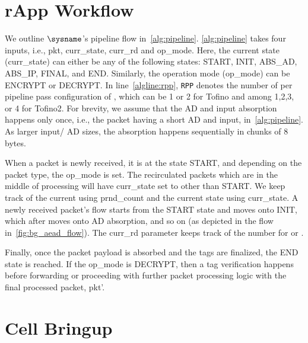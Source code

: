 \clearpage
\appendix
\newpage

\section{rApp Workflow}
\label{appendix:main_algo}

We outline $\sysname$'s pipeline flow in~\cref{alg:pipeline}. 
\cref{alg:pipeline} takes four inputs, i.e., \textsf{pkt}, \textsf{curr\_state}, \textsf{curr\_rd} and \textsf{op\_mode}.
Here, the current state (\textsf{curr\_state}) can either be any of the following states: START, INIT, ABS\_AD, ABS\_IP, FINAL, and END.
Similarly, the operation mode (\textsf{op\_mode}) can be ENCRYPT or DECRYPT.
In line~\ref{algline:rpp}, \texttt{RPP} denotes the number of \pround per pipeline pass configuration of \sysname, which can be 1 or 2 for Tofino and among 1,2,3, or 4 for Tofino2.
For brevity, we assume that the AD and input absorption happens only once, i.e., the packet having a short AD and input, in~\cref{alg:pipeline}. As larger input/ AD sizes, the absorption happens sequentially in chunks of 8 bytes.

When a packet is newly received, it is at the state START, and depending on the packet type,
the \textsf{op\_mode} is set.
The recirculated packets which are in the middle of processing will have \textsf{curr\_state} set to other than START.
We keep track of the current \pround using \textsf{prnd\_count} and the current \ascon state using \textsf{curr\_state}.
A newly received packet's flow starts from the START state and moves onto INIT, which after  moves onto AD absorption, and so on (as depicted in the flow in~\cref{fig:bg_aead_flow}).
The \textsf{curr\_rd} parameter keeps track of the \pround number for  or . 

Finally, once the packet payload is absorbed and the tags are finalized, the END state is reached.
If the \textsf{op\_mode} is DECRYPT, then a tag verification happens before forwarding or proceeding with further packet processing logic with the final processed packet, \textsf{pkt'}.



\section{Cell Bringup}

